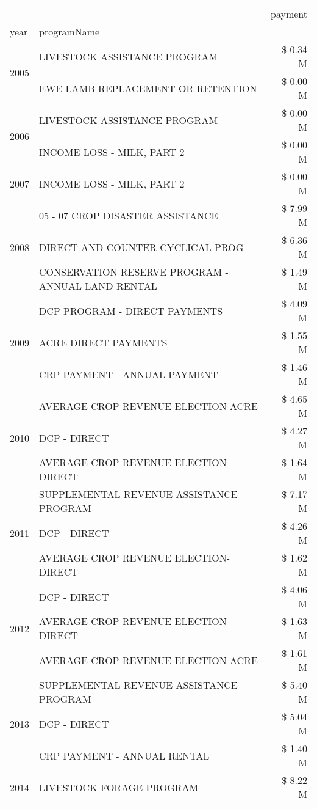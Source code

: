 \begin{tabular}{llr}
\toprule
 &  & payment \\
year & programName &  \\
\midrule
\multirow[t]{2}{*}{2005} & LIVESTOCK ASSISTANCE PROGRAM & \$ 0.34 M \\
 & EWE LAMB REPLACEMENT OR RETENTION & \$ 0.00 M \\
\cline{1-3}
\multirow[t]{2}{*}{2006} & LIVESTOCK ASSISTANCE PROGRAM & \$ 0.00 M \\
 & INCOME LOSS - MILK, PART 2 & \$ 0.00 M \\
\cline{1-3}
2007 & INCOME LOSS - MILK, PART 2 & \$ 0.00 M \\
\cline{1-3}
\multirow[t]{3}{*}{2008} & 05 - 07 CROP DISASTER ASSISTANCE & \$ 7.99 M \\
 & DIRECT AND COUNTER CYCLICAL PROG & \$ 6.36 M \\
 & CONSERVATION RESERVE PROGRAM - ANNUAL LAND RENTAL & \$ 1.49 M \\
\cline{1-3}
\multirow[t]{3}{*}{2009} & DCP PROGRAM - DIRECT PAYMENTS & \$ 4.09 M \\
 & ACRE DIRECT PAYMENTS & \$ 1.55 M \\
 & CRP PAYMENT - ANNUAL PAYMENT & \$ 1.46 M \\
\cline{1-3}
\multirow[t]{3}{*}{2010} & AVERAGE CROP REVENUE ELECTION-ACRE & \$ 4.65 M \\
 & DCP - DIRECT & \$ 4.27 M \\
 & AVERAGE CROP REVENUE ELECTION-DIRECT & \$ 1.64 M \\
\cline{1-3}
\multirow[t]{3}{*}{2011} & SUPPLEMENTAL REVENUE ASSISTANCE PROGRAM & \$ 7.17 M \\
 & DCP - DIRECT & \$ 4.26 M \\
 & AVERAGE CROP REVENUE ELECTION-DIRECT & \$ 1.62 M \\
\cline{1-3}
\multirow[t]{3}{*}{2012} & DCP - DIRECT & \$ 4.06 M \\
 & AVERAGE CROP REVENUE ELECTION-DIRECT & \$ 1.63 M \\
 & AVERAGE CROP REVENUE ELECTION-ACRE & \$ 1.61 M \\
\cline{1-3}
\multirow[t]{3}{*}{2013} & SUPPLEMENTAL REVENUE ASSISTANCE PROGRAM & \$ 5.40 M \\
 & DCP - DIRECT & \$ 5.04 M \\
 & CRP PAYMENT - ANNUAL RENTAL & \$ 1.40 M \\
\cline{1-3}
\multirow[t]{3}{*}{2014} & LIVESTOCK FORAGE PROGRAM & \$ 8.22 M \\

\end{tabular}
